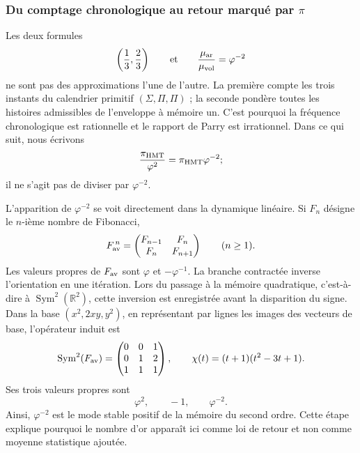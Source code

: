 \subsubsection{Du comptage chronologique au retour marqué par \texorpdfstring{\(\pi\)}{π}}
\label{p12-83-c16-s2:sec:retorno-marcado-pi-phi2}

Les deux formules
\[
 \left(\frac13,\frac23\right)
 \qquad\text{et}\qquad
 \frac{\mu_{\rm ar}}{\mu_{\rm vol}}=\varphi^{-2}
\]
ne sont pas des approximations l'une de l'autre. La première compte les trois instants du
calendrier primitif \((\Sigma,\Pi,\Pi)\) ; la seconde pondère toutes les
histoires admissibles de l'enveloppe à mémoire un. C'est pourquoi la fréquence
chronologique est rationnelle et le rapport de Parry est irrationnel. Dans ce qui suit,
nous écrivons
\[
 \frac{\pi_{\rm HMT}}{\varphi^2}
 =\pi_{\rm HMT}\varphi^{-2};
\]
il ne s'agit pas de diviser par \(\varphi^{-2}\).

L'apparition de \(\varphi^{-2}\) se voit directement dans la dynamique
linéaire. Si \(F_n\) désigne le \(n\)-ième nombre de Fibonacci,
\[
 F_{\rm av}^{\,n}
 =
 \begin{pmatrix}
  F_{n-1}&F_n\\
  F_n&F_{n+1}
 \end{pmatrix}
 \qquad(n\geq1).
\]
Les valeurs propres de \(F_{\rm av}\) sont
\(\varphi\) et \(-\varphi^{-1}\). La branche contractée inverse l'orientation en
une itération. Lors du passage à la mémoire quadratique, c'est-à-dire à
\(\operatorname{Sym}^2(\mathbb R^2)\), cette inversion est enregistrée avant la
disparition du signe. Dans la base \((x^2,2xy,y^2)\), en représentant par
lignes les images des vecteurs de base, l'opérateur induit est
\[
 \operatorname{Sym}^2(F_{\rm av})=
 \begin{pmatrix}
  0&0&1\\
  0&1&2\\
  1&1&1
 \end{pmatrix},
 \qquad
 \chi(t)=(t+1)(t^2-3t+1).
\]
Ses trois valeurs propres sont
\[
 \varphi^2,\qquad -1,\qquad \varphi^{-2}.
\]
Ainsi, \(\varphi^{-2}\) est le mode stable positif de la mémoire du second
ordre. Cette étape explique pourquoi le nombre d'or apparaît ici comme loi de
retour et non comme moyenne statistique ajoutée.

